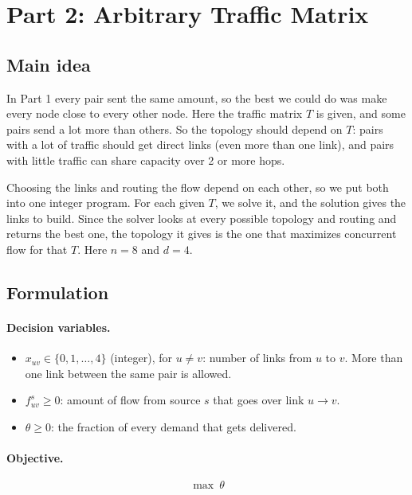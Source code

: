 \section{Part 2: Arbitrary Traffic Matrix}

\subsection*{Main idea}

In Part 1 every pair sent the same amount, so the best we could do was make every node close to
every other node. Here the traffic matrix $T$ is given, and some pairs send a lot more than others.
So the topology should depend on $T$: pairs with a lot of traffic should get direct links (even more
than one link), and pairs with little traffic can share capacity over 2 or more hops.

Choosing the links and routing the flow depend on each other, so we put both into one integer
program. For each given $T$, we solve it, and the solution gives the links to build. Since the solver
looks at every possible topology and routing and returns the best one, the topology it gives is the
one that maximizes concurrent flow for that $T$. Here $n = 8$ and $d = 4$.

\subsection*{Formulation}

\paragraph{Decision variables.}
\begin{itemize}
  \item $x_{uv} \in \{0, 1, \dots, 4\}$ (integer), for $u \neq v$: number of links from $u$ to $v$.
        More than one link between the same pair is allowed.
  \item $f^s_{uv} \ge 0$: amount of flow from source $s$ that goes over link $u \rightarrow v$.
  \item $\theta \ge 0$: the fraction of every demand that gets delivered.
\end{itemize}

\paragraph{Objective.}
\[
\max \ \theta
\]

